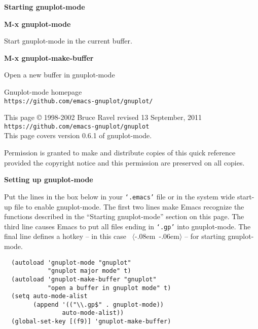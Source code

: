 \documentclass[twocolumn]{article}
\newenvironment{Boxedminipage}%
{\begin{Sbox}\begin{minipage}}%
  {\end{minipage}\end{Sbox}\Ovalbox{\TheSbox}}
\newenvironment{SqBoxedminipage}%
{\begin{Sbox}\begin{minipage}}%
  {\end{minipage}\end{Sbox}\fbox{\TheSbox}}
\def\version{{0.6.1}}
\def\revised{{13 September, 2011}}
\def\file#1{{\texttt{`#1'}}}
\def\key#1{{\textrm \leavevmode\hbox{%
  \raise0.4pt\hbox{$\langle$}\kern-.08em\vtop{%
    \vbox{\hrule\kern-0.4pt
     \hbox{\raise0.4pt\hbox{\vphantom{$\langle$}}#1}}%
    \kern-0.4pt\hrule}%
  \kern-.06em\raise0.4pt\hbox{$\rangle$}}}}
\def\command#1#2{{
    \vspace{-0.2truecm}
    \begin{flushright}
      \begin{minipage}[h]{0.97\linewidth}
        \vspace{-0.2truecm}
        \textbf{#1}\hfill
        \begin{flushright}
          \begin{minipage}[h]{0.93\linewidth}
            \vspace{-0.4truecm}
            #2
          \end{minipage}
        \end{flushright}
      \end{minipage}
    \end{flushright}
    }}
\begin{document}
\vspace{4ex}

\centerline{{\large\textbf{Starting gnuplot-mode}}}
\vspace{2ex}

\command{M-x gnuplot-mode}{Start gnuplot-mode in the current buffer.}
%
\command{M-x gnuplot-make-buffer}{Open a new buffer in gnuplot-mode}



\vfill

\begin{Boxedminipage}{1.05\linewidth}
  \begin{center}
    \footnotesize{Gnuplot-mode homepage} \\
    \scriptsize{%
      \texttt{https://github.com/emacs-gnuplot/gnuplot/}}
  \end{center}
\end{Boxedminipage}
\begin{flushleft}
  {\footnotesize
    This page {\copyright} 1998-2002 Bruce Ravel \hfill revised \revised \\
    \texttt{https://github.com/emacs-gnuplot/gnuplot} \\ %
    This page covers version {\version} of gnuplot-mode.

    Permission is granted to make and distribute copies of this quick
    reference provided the copyright notice and this permission are
    preserved on all copies.}
\end{flushleft}
\pagebreak
\centerline{{\large\textbf{Setting up gnuplot-mode}}}
\vspace{2ex}

Put the lines in the box below in your \file{.emacs} file or in the
system wide start-up file to enable gnuplot-mode.  The first two lines
make Emacs recognize the functions described in the ``Starting
gnuplot-mode'' section on this page.  The third line causes Emacs to
put all files ending in \file{.gp} into gnuplot-mode.  The final line
defines a hotkey -- in this case \key{F9} -- for starting
gnuplot-mode.

\begin{SqBoxedminipage}{\linewidth}
\begin{Verbatim}
  (autoload 'gnuplot-mode "gnuplot"
            "gnuplot major mode" t)
  (autoload 'gnuplot-make-buffer "gnuplot"
            "open a buffer in gnuplot mode" t)
  (setq auto-mode-alist
        (append '(("\\.gp$" . gnuplot-mode))
                auto-mode-alist))
  (global-set-key [(f9)] 'gnuplot-make-buffer)
\end{Verbatim}%
\end{SqBoxedminipage}
\end{document}
